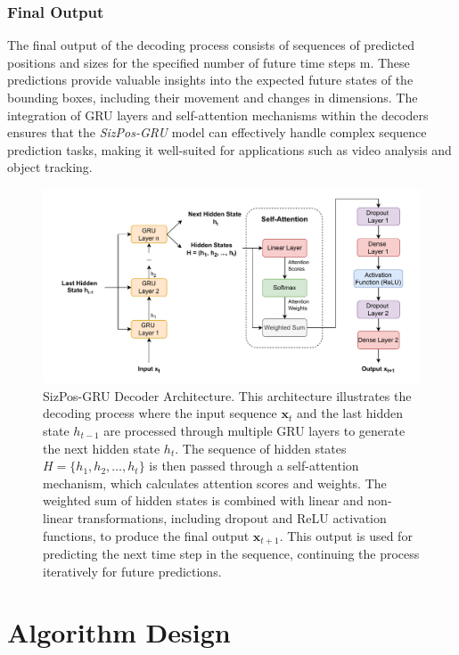 \documentclass[12pt,oneside]{book} %
\begin{document}
\subsubsection{Final Output}
The final output of the decoding process consists of sequences of predicted
positions and sizes for the specified number of future time steps m. These
predictions provide valuable insights into the expected future states of the
bounding boxes, including their movement and changes in dimensions. The
integration of GRU layers and self-attention mechanisms within the decoders
ensures that the \textit{SizPos-GRU} model can effectively handle complex
sequence prediction tasks, making it well-suited for applications such as video
analysis and object tracking.

\begin{figure}[H]
    \centering
    \includegraphics[width=1\textwidth]{figures/GRUSizPosDecoder.drawio.pdf}
    \caption{SizPos-GRU Decoder Architecture. This architecture illustrates the decoding process where the input sequence \( \mathbf{x}_t \) and the last hidden state \( h_{t-1} \) are processed through multiple GRU layers to generate the next hidden state \( h_t \). The sequence of hidden states \( H = \{h_1, h_2, \dots, h_t\} \) is then passed through a self-attention mechanism, which calculates attention scores and weights. The weighted sum of hidden states is combined with linear and non-linear transformations, including dropout and ReLU activation functions, to produce the final output \( \mathbf{x}_{t+1} \). This output is used for predicting the next time step in the sequence, continuing the process iteratively for future predictions.}
    \label{fig:sizpos-gru-decoder}
\end{figure}

\section{Algorithm Design}
\end{document}
